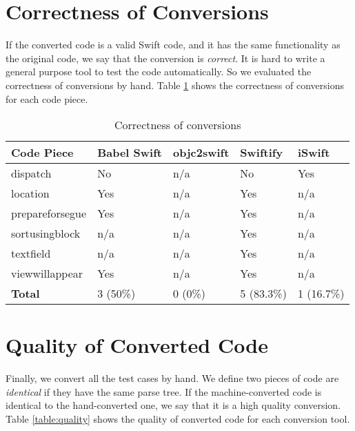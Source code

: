 \documentclass{sfuthesis}
\begin{document}

\section{Correctness of Conversions}

If the converted code is a valid Swift code, and it has the same functionality as the original code, we say that the conversion is \emph{correct}. It is hard to write a general purpose tool to test the code automatically. So we evaluated the correctness of conversions by hand. Table \ref{table:correctness} shows the correctness of conversions for each code piece.

\begin{table}[H]
\begin{center}
\caption{Correctness of conversions}
\label{table:correctness}
\begin{tabular}{|l|l|l|l|l|}
\hline
\textbf{Code Piece} & Babel Swift & objc2swift & Swiftify & iSwift \\
\hline
dispatch        & No  & n/a & No  & Yes \\
location        & Yes & n/a & Yes & n/a \\
prepareforsegue & Yes & n/a & Yes & n/a \\
sortusingblock  & n/a & n/a & Yes & n/a \\
textfield       & n/a & n/a & Yes & n/a \\
viewwillappear  & Yes & n/a & Yes & n/a \\
\hline
\textbf{Total}  & 3 (50\%) & 0 (0\%) & 5 (83.3\%) & 1 (16.7\%) \\
\hline
\end{tabular}
\end{center}
\end{table}

\section{Quality of Converted Code}

Finally, we convert all the test cases by hand. We define two pieces of code are \emph{identical} if they have the same parse tree. If the machine-converted code is identical to the hand-converted one, we say that it is a high quality conversion. Table \ref{table:quality} shows the quality of converted code for each conversion tool.
\end{document}
